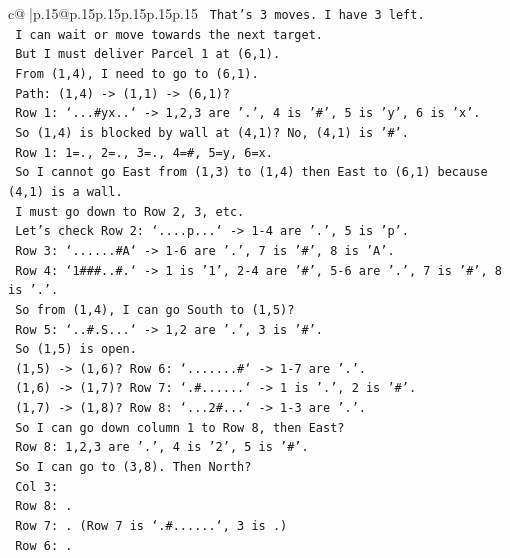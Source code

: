 \documentclass{article}
\begin{document}
{\begin{supertabular}{c@{$\;$}|p{.15\linewidth}@{}p{.15\linewidth}p{.15\linewidth}p{.15\linewidth}p{.15\linewidth}p{.15\linewidth}}
{{{\texttt{     That's 3 moves. I have 3 left.} \\
\texttt{     I can wait or move towards the next target.} \\
\texttt{     But I must deliver Parcel 1 at (6,1).} \\
\texttt{     From (1,4), I need to go to (6,1).} \\
\texttt{     Path: (1,4) {-}> (1,1) {-}> (6,1)?} \\
\texttt{     Row 1: `...\#yx..` {-}> 1,2,3 are '.', 4 is '\#', 5 is 'y', 6 is 'x'.} \\
\texttt{     So (1,4) is blocked by wall at (4,1)? No, (4,1) is '\#'.} \\
\texttt{     Row 1: 1=., 2=., 3=., 4=\#, 5=y, 6=x.} \\
\texttt{     So I cannot go East from (1,3) to (1,4) then East to (6,1) because (4,1) is a wall.} \\
\texttt{     I must go down to Row 2, 3, etc.} \\
\texttt{     Let's check Row 2: `....p...` {-}> 1{-}4 are '.', 5 is 'p'.} \\
\texttt{     Row 3: `......\#A` {-}> 1{-}6 are '.', 7 is '\#', 8 is 'A'.} \\
\texttt{     Row 4: `1\#\#\#..\#.` {-}> 1 is '1', 2{-}4 are '\#', 5{-}6 are '.', 7 is '\#', 8 is '.'.} \\
\texttt{     So from (1,4), I can go South to (1,5)?} \\
\texttt{     Row 5: `..\#.S...` {-}> 1,2 are '.', 3 is '\#'.} \\
\texttt{     So (1,5) is open.} \\
\texttt{     (1,5) {-}> (1,6)? Row 6: `.......\#` {-}> 1{-}7 are '.'.} \\
\texttt{     (1,6) {-}> (1,7)? Row 7: `.\#......` {-}> 1 is '.', 2 is '\#'.} \\
\texttt{     (1,7) {-}> (1,8)? Row 8: `...2\#...` {-}> 1{-}3 are '.'.} \\
\texttt{     So I can go down column 1 to Row 8, then East?} \\
\texttt{     Row 8: 1,2,3 are '.', 4 is '2', 5 is '\#'.} \\
\texttt{     So I can go to (3,8). Then North?} \\
\texttt{     Col 3:} \\
\texttt{     Row 8: .} \\
\texttt{     Row 7: . (Row 7 is `.\#......`, 3 is .)} \\
\texttt{     Row 6: .} \\
}}}
\end{supertabular}}
\end{document}

